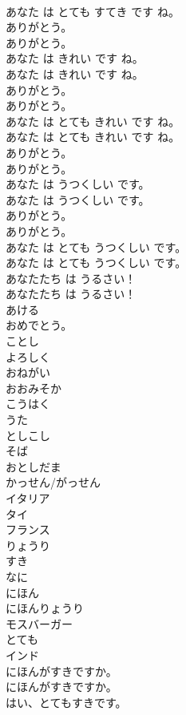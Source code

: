 \documentclass[8pt]{extreport}
\begin{document}
\begin{CJK}{UTF8}{min}
\\	あなた は とても すてき です ね。 
\\	ありがとう。	
\\	ありがとう。 
\\	あなた は きれい です ね。	
\\	あなた は きれい です ね。 
\\	ありがとう。	
\\	ありがとう。 
\\	あなた は とても きれい です ね。	
\\	あなた は とても きれい です ね。 
\\	ありがとう。	
\\	ありがとう。 
\\	あなた は うつくしい です。	
\\	あなた は うつくしい です。 
\\	ありがとう。	
\\	ありがとう。 
\\	あなた は とても うつくしい です。	
\\	あなた は とても うつくしい です。 
\\	あなたたち は うるさい！	
\\	あなたたち は うるさい！ 
\\	あける
\\	おめでとう。
\\	ことし
\\	よろしく
\\	おねがい
\\	おおみそか
\\	こうはく
\\	うた
\\	としこし
\\	そば
\\	おとしだま
\\	かっせん/がっせん
\\	イタリア
\\	タイ
\\	フランス
\\	りょうり
\\	すき
\\	なに
\\	にほん
\\	にほんりょうり
\\	モスバーガー
\\	とても
\\	インド
\\	にほんがすきですか。	
\\	にほんがすきですか。 
\\	はい、とてもすきです。	

\end{CJK}
\end{document}
